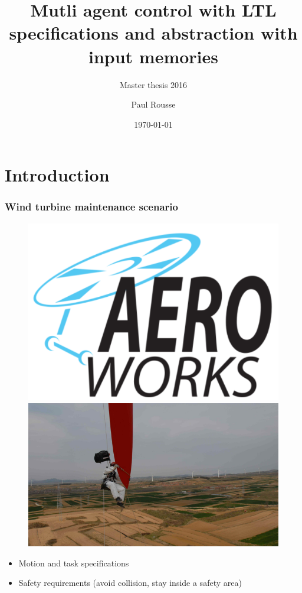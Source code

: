 \documentclass{beamer}
\title{Mutli agent control with LTL specifications and abstraction with input memories}
\subtitle{Master thesis 2016}
\author{Paul Rousse}
\institute{Automatic Departement}
\date{\today}
\begin{document}
\begin{frame}
\titlepage
\end{frame}


\section{Introduction}

\begin{frame}
\frametitle{Wind turbine maintenance scenario}

\begin{figure}
\begin{minipage}{0.2\textwidth}
\centering
\includegraphics[width=\textwidth]{aerowork}
\end{minipage}
\hspace*{\fill}%
\begin{minipage}{0.5\textwidth}
\centering
\includegraphics[width=\textwidth]{windturbine}
\end{minipage}
\end{figure}

\begin{itemize}
\item Motion and task specifications
\item Safety requirements (avoid collision, stay inside a safety area)
\end{itemize}

\end{frame}
\end{document}
